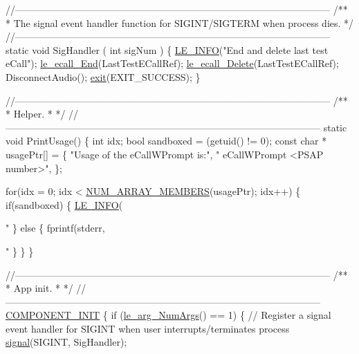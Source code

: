 \begin{DoxyCodeInclude}
{{{{{{{{\textcolor{comment}{//--------------------------------------------------------------------------------------------------}\textcolor{comment}{}
\textcolor{comment}{/**}
\textcolor{comment}{ * The signal event handler function for SIGINT/SIGTERM when process dies.}
\textcolor{comment}{ */}
\textcolor{comment}{//--------------------------------------------------------------------------------------------------}
\textcolor{keyword}{static} \textcolor{keywordtype}{void} SigHandler
(
    \textcolor{keywordtype}{int} sigNum
)
\{
    \hyperlink{le__log_8h_a23e6d206faa64f612045d688cdde5808}{LE\_INFO}(\textcolor{stringliteral}{"End and delete last test eCall"});
    \hyperlink{le__ecall__interface_8h_a85800c86f9709fb7baa7219cc762181c}{le\_ecall\_End}(LastTestECallRef);
    \hyperlink{le__ecall__interface_8h_af1221deb68c46912748f65505b3e4919}{le\_ecall\_Delete}(LastTestECallRef);
    DisconnectAudio();
    \hyperlink{app_stop_client_8c_a310220604a584e112ba8f7aa3dfe23f1}{exit}(EXIT\_SUCCESS);
\}

\textcolor{comment}{//--------------------------------------------------------------------------------------------------}\textcolor{comment}{}
\textcolor{comment}{/**}
\textcolor{comment}{ * Helper.}
\textcolor{comment}{ *}
\textcolor{comment}{ */}
\textcolor{comment}{//--------------------------------------------------------------------------------------------------}
\textcolor{keyword}{static} \textcolor{keywordtype}{void} PrintUsage()
\{
    \textcolor{keywordtype}{int} idx;
    \textcolor{keywordtype}{bool} sandboxed = (getuid() != 0);
    \textcolor{keyword}{const} \textcolor{keywordtype}{char} * usagePtr[] = \{
            \textcolor{stringliteral}{"Usage of the eCallWPrompt is:"},
            \textcolor{stringliteral}{"   eCallWPrompt <PSAP number>"},
    \};

    \textcolor{keywordflow}{for}(idx = 0; idx < \hyperlink{le__basics_8h_a8d8f28a045f43b477cafb67a99894c07}{NUM\_ARRAY\_MEMBERS}(usagePtr); idx++)
    \{
        \textcolor{keywordflow}{if}(sandboxed)
        \{
            \hyperlink{le__log_8h_a23e6d206faa64f612045d688cdde5808}{LE\_INFO}(\textcolor{stringliteral}{"%
        \}
        \textcolor{keywordflow}{else}
        \{
            fprintf(stderr, \textcolor{stringliteral}{"%
        \}
    \}
\}

\textcolor{comment}{//--------------------------------------------------------------------------------------------------}\textcolor{comment}{}
\textcolor{comment}{/**}
\textcolor{comment}{ * App init.}
\textcolor{comment}{ *}
\textcolor{comment}{ */}
\textcolor{comment}{//--------------------------------------------------------------------------------------------------}
\hyperlink{le__event_loop_8h_abdb9187a56836a93d19cc793cbd4b7ec}{COMPONENT\_INIT}
\{
    \textcolor{keywordflow}{if} (\hyperlink{le__args_8h_a6fbbeb423104e6eb92fe47ef42b7310a}{le\_arg\_NumArgs}() == 1)
    \{
        \textcolor{comment}{// Register a signal event handler for SIGINT when user interrupts/terminates process}
        \hyperlink{wifi_ap_test_8c_a8db34e235c60f54c3df89f2b6b8ca3ed}{signal}(SIGINT, SigHandler);

}}}}}}}}}}
\end{DoxyCodeInclude}
